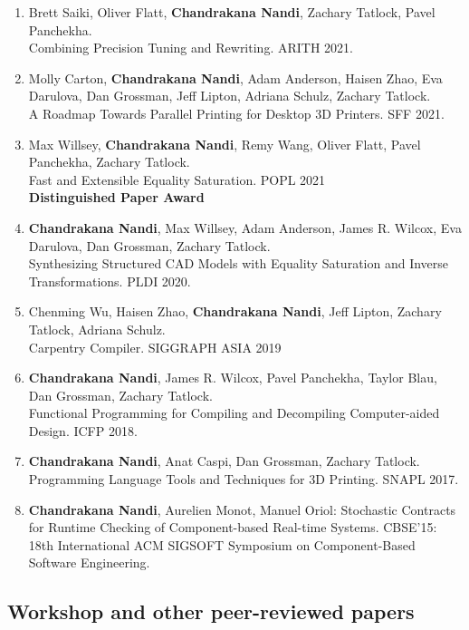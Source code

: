 \documentclass[margin, 10pt]{res} %
\begin{document}
\begin{resume}
\begin{enumerate}
\item Brett Saiki, Oliver Flatt, \textbf{Chandrakana Nandi}, Zachary Tatlock, Pavel Panchekha. \\
  Combining Precision Tuning and Rewriting. ARITH 2021.

\item Molly Carton, \textbf{Chandrakana Nandi}, Adam Anderson, Haisen Zhao, Eva Darulova, Dan Grossman, Jeff Lipton, Adriana Schulz, Zachary Tatlock. \\
  A Roadmap Towards Parallel Printing for Desktop 3D Printers. SFF 2021.

\item Max Willsey, \textbf{Chandrakana Nandi}, Remy Wang, Oliver Flatt, Pavel Panchekha, Zachary Tatlock. \\
    Fast and Extensible Equality Saturation. POPL 2021 \\
    \textbf{Distinguished Paper Award}

  \item \textbf{Chandrakana Nandi}, Max Willsey, Adam Anderson, James R. Wilcox, Eva Darulova, Dan Grossman, Zachary Tatlock. \\
    Synthesizing Structured CAD Models with Equality Saturation and Inverse Transformations. PLDI 2020.
  \item Chenming Wu, Haisen Zhao, \textbf{Chandrakana Nandi}, Jeff Lipton, Zachary Tatlock, Adriana Schulz. \\
    Carpentry Compiler. SIGGRAPH ASIA 2019

  \item \textbf{Chandrakana Nandi}, James R. Wilcox, Pavel Panchekha, Taylor Blau, Dan Grossman, Zachary Tatlock. \\
    Functional Programming for Compiling and Decompiling Computer-aided Design. ICFP 2018.
  \item \textbf{Chandrakana Nandi}, Anat Caspi, Dan Grossman, Zachary Tatlock. \\
    Programming Language Tools and Techniques for 3D Printing. SNAPL 2017.

\item \textbf{Chandrakana Nandi}, Aurelien Monot, Manuel Oriol: Stochastic Contracts for Runtime Checking of Component-based Real-time Systems. CBSE'15: 18th International ACM SIGSOFT Symposium on Component-Based Software Engineering.
\end{enumerate}


\subsection{Workshop and other peer-reviewed papers}


\end{resume}
\end{document}
